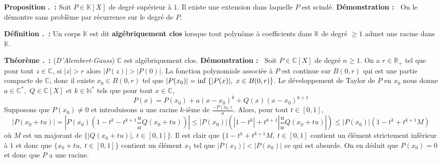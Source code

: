 \documentclass[5pt,a4paper]{article}
\newcounter{prop}[section]
\newcounter{defin}[section]
\newcounter{thm}[section]
\renewcommand{\theprop}{\thesection.\arabic{prop}}
\renewcommand{\thedefin}{\thesection.\arabic{defin}}
\renewcommand{\thethm}{\thesection.\arabic{thm}}
\newcommand{\prop}[1]{\stepcounter{prop}\noindent\textbf{Proposition \theprop ~:} #1 \newline}
\newcommand{\defin}[1]{\stepcounter{defin}\noindent\textbf{Définition \thedefin ~:} #1 \newline}
\newcommand{\thm}[1]{\stepcounter{thm}\noindent\textbf{Théorème \thethm ~:} #1 \newline}
\newcommand{\demo}[1]{\textbf{Démonstration :~} #1 \newline}
\begin{document}
\begin{onehalfspacing}
\prop{Soit $P \in \mathbb{K}[X]$ de degré supérieur à $1$. Il existe une extension dans laquelle $P$ est scindé.}
\demo{On le démontre sans problème par récurrence sur le degré de $P$.}


\defin{Un corps $\mathbb{K}$ est dit \textbf{algébriquement clos} lorsque tout polynôme à coefficients dans $\mathbb{K}$ de degré $\geq 1$ admet une racine dans $\mathbb{K}$.}


\thm{(\textit{D'Alembert-Gauss}) $\mathbb{C}$ est algébriquement clos.}
\demo{Soit $P \in \mathbb{C}[X]$ de degré $n \geq 1$. On a $r \in \mathbb{R}_{+}$ tel que pour tout $z \in \mathbb{C}$, si $|z| > r$ alors $|P(z)| > |P(0)|$. La fonction polynomiale associée à $P$ est continue sur $B(0, r)$ qui est une partie compacte de $\mathbb{C}$, donc il existe $x_{0} \in B(0, r)$ tel que $|P(x_{0})| = \textup{inf}~\{|P(x)|,~x \in B(0, r)\}$. Le développement de Taylor de $P$ en $x_{0}$ nous donne $a \in \mathbb{C}^*,$ $Q \in \mathbb{C}[X]$ et $k \in \mathbb{N}^{*}$ tels que pour tout $x \in \mathbb{C}$,
\[P(x) = P(x_{0}) + a(x - x_{0})^k + Q(x)(x - x_{0})^{k+1}\]
Supposons que $P(x_{0}) \neq 0$ et introduisons $u$ une racine $k$-ième de $\frac{-P(x_{0})}{a}$. Alors, pour tout $t \in [0, 1]$, 
\[|P(x_{0} + tu)| = |P(x_{0})(1 - t^k - t^{k+1}\frac{u}{a}Q(x_{0} + tu))| \leq  |P(x_{0})|(|1 - t^k| + t^{k+1} |\frac{u}{a}Q(x_{0} + tu)|) \leq |P(x_{0})|(1 - t^k + t^{k+1}M)\]
où $M$ est un majorant de $\{|Q(x_{0} + tu)|,~t \in [0, 1]\}$. Il est clair que $\{1 - t^k + t^{k+1}M,~t\in [0, 1]$ contient un élément strictement inférieur à $1$ et donc que $\{x_{0} + tu,~t \in [0, 1]\}$ contient un élément $x_{1}$ tel que $|P(x_{1})| < |P(x_{0})|$ ce qui est absurde. On en déduit que $P(x_{0}) = 0$ et donc que $P$ a une racine.}



\end{onehalfspacing}
\end{document}
